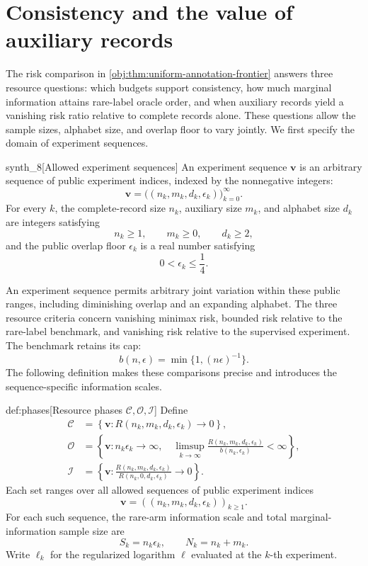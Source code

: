 \documentclass[11pt]{article}
\begin{document}
\section{Consistency and the value of auxiliary records}

The risk comparison in \cref{obj:thm:uniform-annotation-frontier} answers three resource questions: which budgets support consistency, how much marginal information attains rare-label oracle order, and when auxiliary records yield a vanishing risk ratio relative to complete records alone. These questions allow the sample sizes, alphabet size, and overlap floor to vary jointly. We first specify the domain of experiment sequences.

\begin{definitionv}{synth_8}[Allowed experiment sequences]
An experiment sequence \(\mathbf v\) is an arbitrary sequence of public experiment indices, indexed by the nonnegative integers:
\[
\mathbf v=\bigl((n_k,m_k,d_k,\epsilon_k)\bigr)_{k=0}^{\infty}.
\]
For every \(k\), the complete-record size \(n_k\), auxiliary size \(m_k\), and alphabet size \(d_k\) are integers satisfying
\[
n_k\ge 1,\qquad m_k\ge 0,\qquad d_k\ge 2,
\]
and the public overlap floor \(\epsilon_k\) is a real number satisfying
\[
0<\epsilon_k\le \frac14.
\]
\end{definitionv}

An experiment sequence  permits arbitrary joint variation within these public ranges, including diminishing overlap and an expanding alphabet. The three resource criteria concern vanishing minimax risk, bounded risk relative to the rare-label benchmark, and vanishing risk relative to the supervised experiment. The benchmark retains its cap:
\[
b(n,\epsilon)=\min\{1,(n\epsilon)^{-1}\}.
\]
The following definition makes these comparisons precise and introduces the sequence-specific information scales.

\begin{definitionv}{def:phases}[Resource phases \(\mathcal C,\mathcal O,\mathcal I\)]
Define
\[
\begin{aligned}
\mathcal C
&=\left\{\mathbf v:
R(n_k,m_k,d_k,\epsilon_k)\longrightarrow 0\right\},\\
\mathcal O
&=\left\{\mathbf v:
n_k\epsilon_k\longrightarrow\infty,\quad
\limsup_{k\to\infty}
\frac{R(n_k,m_k,d_k,\epsilon_k)}{b(n_k,\epsilon_k)}
<\infty\right\},\\
\mathcal I
&=\left\{\mathbf v:
\frac{R(n_k,m_k,d_k,\epsilon_k)}
{R(n_k,0,d_k,\epsilon_k)}
\longrightarrow 0\right\}.
\end{aligned}
\]
Each set ranges over all allowed sequences of public experiment indices
\[
\mathbf v=((n_k,m_k,d_k,\epsilon_k))_{k\ge1}.
\]
For each such sequence, the rare-arm information scale and total marginal-information sample size are
\[
S_k=n_k\epsilon_k,\qquad N_k=n_k+m_k.
\]
Write \(\ell_k\) for the regularized logarithm \(\ell\) evaluated at the \(k\)-th experiment.
\end{definitionv}
\end{document}
